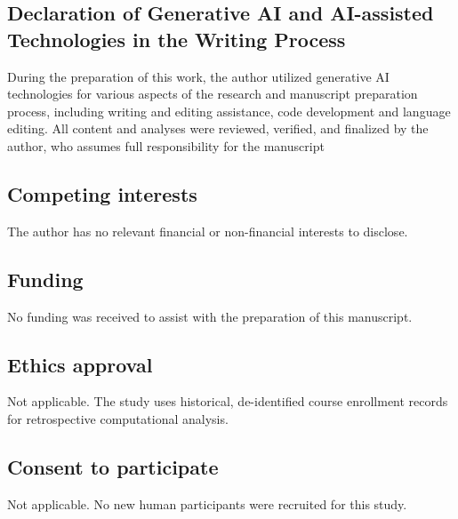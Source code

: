 \documentclass[pdflatex,sn-mathphys-num,iicol]{sn-jnl}%
\theoremstyle{thmstyleone}%
\theoremstyle{thmstyletwo}%
\theoremstyle{thmstylethree}%
\begin{document}
\subsection*{Declaration of Generative AI and AI-assisted Technologies in the Writing Process}


During the preparation of this work, the author utilized generative AI technologies for various aspects of the research and manuscript preparation process, including writing and editing assistance, code development and language editing. All content and analyses were reviewed, verified, and finalized by the author, who assumes full responsibility for the manuscript

\subsection*{Competing interests}
The author has no relevant financial or non-financial interests to disclose.

\subsection*{Funding}
No funding was received to assist with the preparation of this manuscript.
%
\subsection*{Ethics approval}
Not applicable. The study uses historical, de-identified course enrollment records for retrospective computational analysis.

\subsection*{Consent to participate}
Not applicable. No new human participants were recruited for this study.
\end{document}

